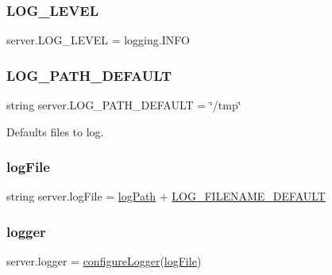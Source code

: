 \mbox{\label{namespaceserver_a623756b923995322c8ea575f3b9e70ba}} 
\subsubsection{\texorpdfstring{L\+O\+G\+\_\+\+L\+E\+V\+EL}{LOG\_LEVEL}}
{\footnotesize\ttfamily server.\+L\+O\+G\+\_\+\+L\+E\+V\+EL = logging.\+I\+N\+FO}

\mbox{\label{namespaceserver_a6e3160a2459a5f5c0b05d31bea269c07}} 
\subsubsection{\texorpdfstring{L\+O\+G\+\_\+\+P\+A\+T\+H\+\_\+\+D\+E\+F\+A\+U\+LT}{LOG\_PATH\_DEFAULT}}
{\footnotesize\ttfamily string server.\+L\+O\+G\+\_\+\+P\+A\+T\+H\+\_\+\+D\+E\+F\+A\+U\+LT = \char`\"{}/tmp\char`\"{}}



Defaults files to log. 

\mbox{\label{namespaceserver_ab968a55cbe8af171a0fcbae9a876cab4}} 
\subsubsection{\texorpdfstring{log\+File}{logFile}}
{\footnotesize\ttfamily string server.\+log\+File = \hyperlink{namespaceserver_a45d593b7c621a117aaef105bf59d9fd5}{log\+Path} + \hyperlink{namespaceserver_ae9611c1fa51131280e6b7c2e7ea199af}{L\+O\+G\+\_\+\+F\+I\+L\+E\+N\+A\+M\+E\+\_\+\+D\+E\+F\+A\+U\+LT}}

\mbox{\label{namespaceserver_abfa1d56012bc320e4b26361390f6fc24}} 
\subsubsection{\texorpdfstring{logger}{logger}}
{\footnotesize\ttfamily server.\+logger = \hyperlink{namespaceserver_a44a7428717edc164d7dd564478da2da3}{configure\+Logger}(\hyperlink{namespaceserver_ab968a55cbe8af171a0fcbae9a876cab4}{log\+File})}

